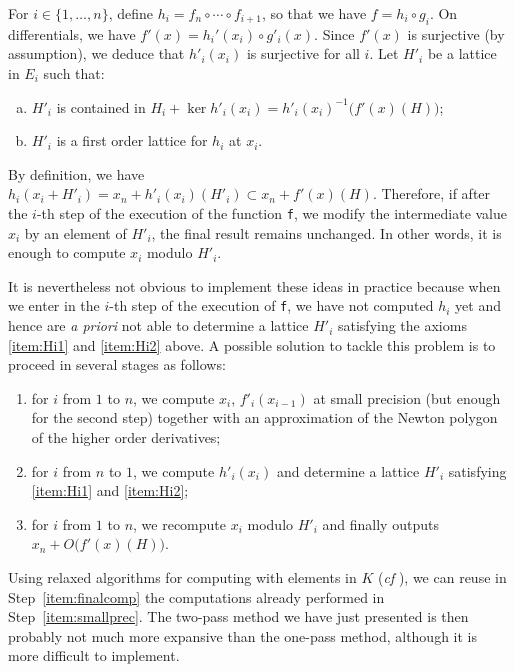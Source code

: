 \documentclass{lms}
\begin{document}
For $i \in \{1, \ldots, n\}$, define $h_i = f_n \circ \cdots \circ 
f_{i+1}$, so that we have $f = h_i \circ g_i$. On differentials, we 
have $f'(x) = h_i'(x_i) \circ g'_i(x)$. Since $f'(x)$ is surjective (by 
assumption), we deduce that $h'_i(x_i)$ is surjective for all $i$. Let $H'_i$ 
be a lattice in $E_i$ such that:
\begin{enumerate}[(a)] 
\item \label{item:Hi1}
$H'_i$ is contained in $H_i + \ker h'_i(x_i) = h'_i(x_i)^{-1}
\big(f'(x)(H)\big)$;
\item \label{item:Hi2}
$H'_i$ is a first order lattice for $h_i$ at $x_i$.
\end{enumerate}
By definition, we have
$h_i(x_i + H'_i) = x_n + h'_i(x_i)(H'_i) \subset x_n + f'(x)(H)$.
Therefore, if after the $i$-th step of the execution of the function
{\tt f}, we modify the intermediate value $x_i$ by an element of
$H'_i$, the final result remains unchanged. In other words, it is
enough to compute $x_i$ modulo $H'_i$.

It is nevertheless not obvious to implement these ideas in practice
because when we enter in the $i$-th step of the execution of {\tt f},
we have not computed $h_i$ yet and hence are \emph{a priori} not able
to determine a lattice $H'_i$ satisfying the axioms \eqref{item:Hi1}
and \eqref{item:Hi2} above.
A possible solution to tackle this problem is to proceed in several
stages as follows: 
\begin{enumerate}[(1)]
\item \label{item:smallprec}
for $i$ from $1$ to $n$, we compute $x_i$, $f'_i(x_{i-1})$ 
at small precision (but enough for the second step) together with an
approximation of the Newton polygon of the higher order derivatives;
\item \label{item:determineHi}
for $i$ from $n$ to $1$, we compute $h'_i(x_i)$ and
determine a lattice $H'_i$ satisfying \eqref{item:Hi1} and 
\eqref{item:Hi2};
\item \label{item:finalcomp}
for $i$ from $1$ to $n$, we recompute $x_i$ modulo $H'_i$
and finally outputs $x_n + O\big(f'(x)(H)\big)$.
\end{enumerate}
Using relaxed algorithms for computing with elements in $K$ (\emph{cf} 
\cites{hoeven:02a, hoeven:07a, berthomieu-hoeven-lecerf:11a}), we can reuse in 
Step~\eqref{item:finalcomp} the computations already performed in 
Step~\eqref{item:smallprec}. The two-pass method we have just 
presented is then probably not much more expansive than the one-pass 
method, although it is more difficult to implement.
\end{document}
